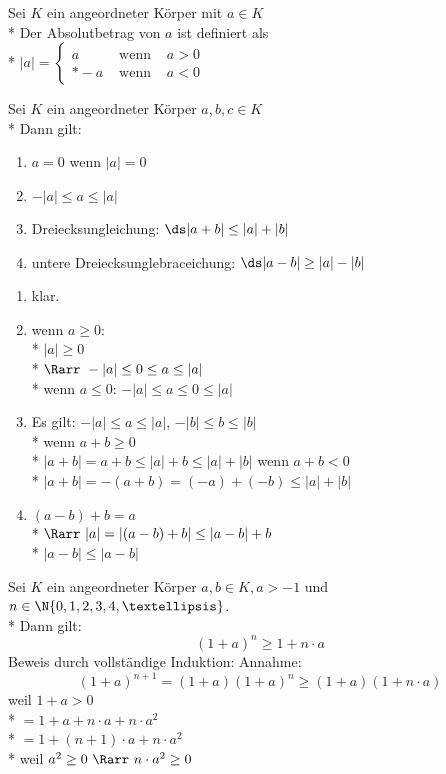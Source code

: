 	Sei $K$ ein angeordneter Körper mit $a \in K$\\*
	Der Absolutbetrag von $a$ ist definiert als \\*
	$|a| = \left\lbrace \begin{array}{rcr}
	a&\text{ wenn }&a > 0\\*
	-a&\text{ wenn }&a < 0
	\end{array}\right.$

	Sei $K$ ein angeordneter Körper $a, b, c \in K$\\*
	Dann gilt:
	\begin{enumerate}
	\item{$a = 0$ wenn $|a| = 0$}
	\item{$-|a| \leq a \leq |a|$}
	\item{Dreiecksungleichung: $\ds |a + b| \leq |a| + |b|$}
	\item{untere Dreiecksunglebraceichung: $\ds |a - b| \geq |a| - |b|$}
	\end{enumerate}
\bew
	\begin{enumerate}
	\item{klar.}
	\item{wenn $a \geq 0$:\\*
	$|a| \geq 0$\\*
	$\Rarr\ -|a| \leq 0 \leq a \leq |a|$\\*
	wenn $a \leq 0$:
	$-|a| \leq a \leq 0 \leq |a|$}
	\item{Es gilt: $-|a| \leq a \leq |a|$, $-|b| \leq b \leq |b|$\\*
	wenn $a + b \geq 0$\\*
	$|a + b| = a + b \leq |a| + b \leq |a| + |b|$
	wenn $a + b < 0$\\*
	$|a + b| = -(a + b) = (-a) + (-b) \leq |a| + |b|$}
	\item{$(a - b) + b = a$\\*
	$\Rarr\ |a| = |(a - b) + b| \leq |a - b| + b$\\*
	$|a - b| \leq |a - b|$} %
	\end{enumerate}

	Sei $K$ ein angeordneter Körper $a, b \in K, a > -1$ und $n \in \N \{0, 1, 2, 3, 4, …\}$.\\*
	Dann gilt:
	$$(1 + a)^n \geq 1 + n \cdot a$$
	Beweis durch vollständige Induktion:
	{Annahme:
	$$(1 + a)^{n + 1} = (1 + a)(1 + a)^n \geq (1 + a)(1 + n \cdot a)$$
	weil $1 + a > 0$\\*
	$= 1 + a + n \cdot a + n \cdot a^2$\\*
	$= 1 + (n + 1) \cdot a + n \cdot a^2$\\*
	weil $a^2 \geq 0\ \Rarr\ n \cdot a^2 \geq 0$}


